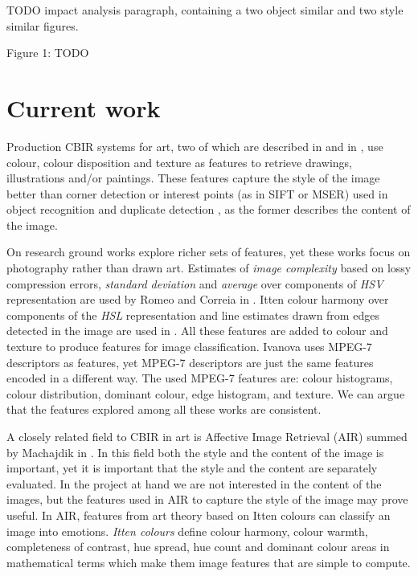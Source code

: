 \documentclass[a4paper]{article}
\begin{document}
TODO impact analysis paragraph, containing a two object similar and two style
similar figures.

Figure 1: TODO

\section{Current work}

Production CBIR systems for art, two of which are described in \cite{cfsp12air}
and in \cite{ymvz03tree}, use colour, colour disposition and texture as
features to retrieve drawings, illustrations and/or paintings.  These features
capture the style of the image better than corner detection or interest points
(as in SIFT or MSER) used in object recognition and duplicate detection
\cite{szel11book}, as the former describes the content of the image.

On research ground works explore richer sets of features, yet these works focus
on photography rather than drawn art.  Estimates of \emph{image complexity}
based on lossy compression errors, \emph{standard deviation} and \emph{average}
over components of \emph{HSV} representation are used by Romeo and Correia in
\cite{jma12clas,cmrc13fs,rmc12ajs}.  Itten colour harmony over components of
the \emph{HSL} representation and line estimates drawn from edges detected in
the image are used in \cite{mach10clas}.  All these features are added to
colour and texture to produce features for image classification.  Ivanova
\cite{isv12mpeg} uses MPEG-7 descriptors as features, yet MPEG-7 descriptors
are just the same features encoded in a different way.  The used MPEG-7
features are: colour histograms, colour distribution, dominant colour, edge
histogram, and texture.  We can argue that the features explored among all
these works are consistent.

A closely related field to CBIR in art is Affective Image Retrieval (AIR)
summed by Machajdik in \cite{mach10ua,mach10clas}.  In this field both the
style and the content of the image is important, yet it is important that the
style and the content are separately evaluated.  In the project at hand we are
not interested in the content of the images, but the features used in AIR to
capture the style of the image may prove useful.  In AIR, features from art
theory based on Itten colours can classify an image into emotions.  \emph{Itten
colours} define colour harmony, colour warmth, completeness of contrast, hue
spread, hue count and dominant colour areas in mathematical terms which make
them image features that are simple to compute.
\end{document}
